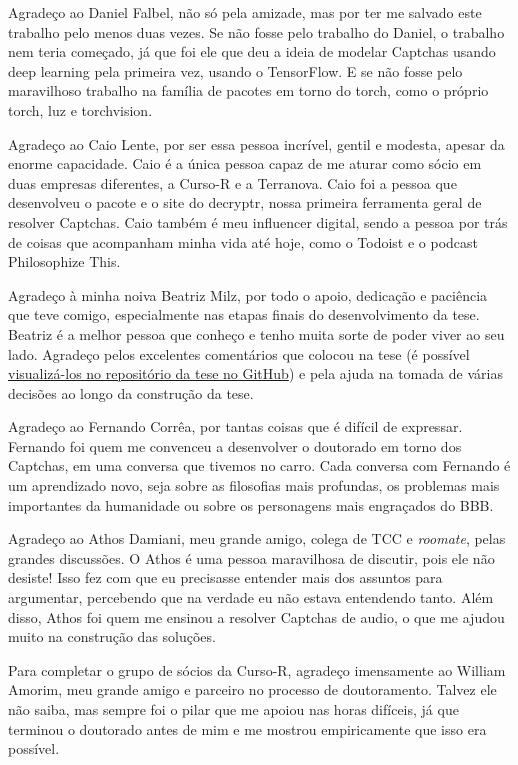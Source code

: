 \documentclass[12pt,twoside,brazilian]{book}
\begin{document}
Agradeço ao Daniel Falbel, não só pela amizade, mas por ter me salvado este trabalho pelo menos duas vezes. Se não fosse pelo trabalho do Daniel, o trabalho nem teria começado, já que foi ele que deu a ideia de modelar Captchas usando deep learning pela primeira vez, usando o TensorFlow. E se não fosse pelo maravilhoso trabalho na família de pacotes em torno do torch, como o próprio torch, luz e torchvision.

Agradeço ao Caio Lente, por ser essa pessoa incrível, gentil e modesta, apesar da enorme capacidade. Caio é a única pessoa capaz de me aturar como sócio em duas empresas diferentes, a Curso-R e a Terranova. Caio foi a pessoa que desenvolveu o pacote e o site do decryptr, nossa primeira ferramenta geral de resolver Captchas. Caio também é meu influencer digital, sendo a pessoa por trás de coisas que acompanham minha vida até hoje, como o Todoist e o podcast Philosophize This.

Agradeço à minha noiva Beatriz Milz, por todo o apoio, dedicação e paciência que teve comigo, especialmente nas etapas finais do desenvolvimento da tese. Beatriz é a melhor pessoa que conheço e tenho muita sorte de poder viver ao seu lado. Agradeço pelos excelentes comentários que colocou na tese (é possível \href{https://github.com/jtrecenti/doutorado/pulls?q=is\%3Apr}{visualizá-los no repositório da tese no GitHub}) e pela ajuda na tomada de várias decisões ao longo da construção da tese.

Agradeço ao Fernando Corrêa, por tantas coisas que é difícil de expressar. Fernando foi quem me convenceu a desenvolver o doutorado em torno dos Captchas, em uma conversa que tivemos no carro. Cada conversa com Fernando é um aprendizado novo, seja sobre as filosofias mais profundas, os problemas mais importantes da humanidade ou sobre os personagens mais engraçados do BBB.

Agradeço ao Athos Damiani, meu grande amigo, colega de TCC e \textit{roomate}, pelas grandes discussões. O Athos é uma pessoa maravilhosa de discutir, pois ele não desiste! Isso fez com que eu precisasse entender mais dos assuntos para argumentar, percebendo que na verdade eu não estava entendendo tanto. Além disso, Athos foi quem me ensinou a resolver Captchas de audio, o que me ajudou muito na construção das soluções.

Para completar o grupo de sócios da Curso-R, agradeço imensamente ao William Amorim, meu grande amigo e parceiro no processo de doutoramento. Talvez ele não saiba, mas sempre foi o pilar que me apoiou nas horas difíceis, já que terminou o doutorado antes de mim e me mostrou empiricamente que isso era possível.
\end{document}
